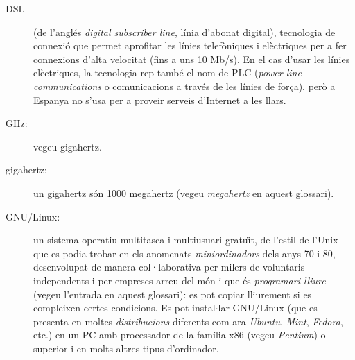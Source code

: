 \begin{description}


  
\item[DSL] (de l'anglés \emph{digital subscriber line}, línia d'abonat
  digital), tecnologia de connexió que permet aprofitar les línies
  telefòniques i elèctriques per a fer connexions d'alta velocitat
  (fins a uns 10 Mb/s). En el cas d'usar les línies elèctriques, la
  tecnologia rep també el nom de PLC (\emph{power line communications}
  o comunicacions a través de les línies de força), però a Espanya no
  s'usa per a proveir serveis d'Internet a les llars.

\item[GHz:] vegeu gigahertz.

\item[gigahertz:] un gigahertz són 1000 megahertz (vegeu
  \emph{megahertz} en aquest glossari).
  
\item[GNU/Linux:] un sistema operatiu multitasca i multiusuari
  gratu\"{\i}t, de l'estil de l'Unix que es podia trobar en els
  anomenats \emph{miniordinadors} dels anys 70 i 80, desenvolupat de
  manera col·laborativa per milers de voluntaris independents i per
  empreses arreu del món i que és \emph{programari lliure} (vegeu
  l'entrada en aquest glossari): es pot copiar lliurement si es
  compleixen certes condicions. Es pot instal$\cdot$lar GNU/Linux (que
  es presenta en moltes \emph{distribucions} diferents com ara
  \emph{Ubuntu}, \emph{Mint}, \emph{Fedora}, etc.) en un PC amb
  processador de la família x86 (vegeu \emph{Pentium}) o superior i en
  molts altres tipus d'ordinador.
  

\end{description}
